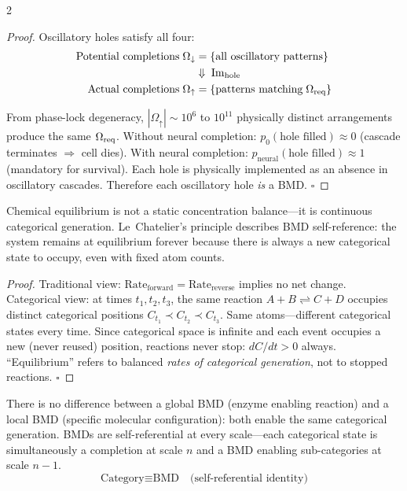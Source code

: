 \begin{multicols}{2}
\begin{proof}
Oscillatory holes satisfy all four:
\begin{align}
\text{Potential completions}\;\Omega_{\downarrow} &= \{\text{all oscillatory patterns}\} \\
                           &\Downarrow\;\Im_{\text{hole}} \\
\text{Actual completions}\;\Omega_{\uparrow} &= \{\text{patterns matching}\;\Omega_{\text{req}}\}
\end{align}

From phase-lock degeneracy, $|\Omega_\uparrow| \sim 10^6$ to $10^{11}$
physically distinct arrangements produce the same $\Omega_{\text{req}}$.
Without neural completion: $p_0(\text{hole filled})\approx0$ (cascade
terminates $\Rightarrow$ cell dies).  With neural completion:
$p_{\text{neural}}(\text{hole filled})\approx1$ (mandatory for survival).
Each hole is physically implemented as an absence in oscillatory cascades.
Therefore each oscillatory hole \emph{is} a BMD. $\square$
\end{proof}

\begin{theorem}
\label{thm:equilibrium_categorical}
Chemical equilibrium is not a static concentration balance---it is
continuous categorical generation.  Le~Chatelier's principle describes
BMD self-reference: the system remains at equilibrium forever because
there is always a new categorical state to occupy, even with fixed atom
counts.
\end{theorem}

\begin{proof}
Traditional view: $\text{Rate}_{\text{forward}} = \text{Rate}_{\text{reverse}}$
implies no net change.  Categorical view: at times $t_1, t_2, t_3$, the
same reaction $A+B \rightleftharpoons C+D$ occupies distinct categorical
positions $C_{t_1} \prec C_{t_2} \prec C_{t_3}$.  Same atoms---different
categorical states every time.  Since categorical space is infinite and
each event occupies a new (never reused) position, reactions never stop:
$dC/dt > 0$ always.  ``Equilibrium'' refers to balanced \emph{rates of
categorical generation}, not to stopped reactions. $\square$
\end{proof}

\begin{corollary}
\label{cor:bmd_scale}
There is no difference between a global BMD (enzyme enabling reaction) and
a local BMD (specific molecular configuration): both enable the same
categorical generation.  BMDs are self-referential at every scale---each
categorical state is simultaneously a completion at scale $n$ and a BMD
enabling sub-categories at scale $n-1$.
\begin{equation}
\text{Category} \equiv \text{BMD} \quad\text{(self-referential identity)}
\end{equation}
\end{corollary}

\end{multicols}


